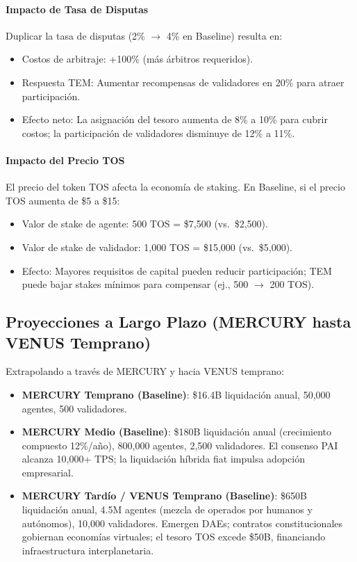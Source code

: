 \documentclass[11pt]{article}
\begin{document}
\paragraph{Impacto de Tasa de Disputas}
Duplicar la tasa de disputas (2\% $\to$ 4\% en Baseline) resulta en:
\begin{itemize}[noitemsep]
  \item Costos de arbitraje: +100\% (más árbitros requeridos).
  \item Respuesta TEM: Aumentar recompensas de validadores en 20\% para atraer participación.
  \item Efecto neto: La asignación del tesoro aumenta de 8\% a 10\% para cubrir costos; la participación de validadores disminuye de 12\% a 11\%.
\end{itemize}

\paragraph{Impacto del Precio TOS}
El precio del token TOS afecta la economía de staking. En Baseline, si el precio TOS aumenta de \$5 a \$15:
\begin{itemize}[noitemsep]
  \item Valor de stake de agente: 500 TOS = \$7{,}500 (vs.\ \$2{,}500).
  \item Valor de stake de validador: 1,000 TOS = \$15{,}000 (vs.\ \$5{,}000).
  \item Efecto: Mayores requisitos de capital pueden reducir participación; TEM puede bajar stakes mínimos para compensar (ej., 500 $\to$ 200 TOS).
\end{itemize}

\subsection{Proyecciones a Largo Plazo (MERCURY hasta VENUS Temprano)}
Extrapolando a través de MERCURY y hacia VENUS temprano:
\begin{itemize}[noitemsep]
  \item \textbf{MERCURY Temprano (Baseline)}: \$16.4B liquidación anual, 50,000 agentes, 500 validadores.
  \item \textbf{MERCURY Medio (Baseline)}: \$180B liquidación anual (crecimiento compuesto 12\%/año), 800,000 agentes, 2,500 validadores. El consenso PAI alcanza 10,000+ TPS; la liquidación híbrida fiat impulsa adopción empresarial.
  \item \textbf{MERCURY Tardío / VENUS Temprano (Baseline)}: \$650B liquidación anual, 4.5M agentes (mezcla de operados por humanos y autónomos), 10,000 validadores. Emergen DAEs; contratos constitucionales gobiernan economías virtuales; el tesoro TOS excede \$50B, financiando infraestructura interplanetaria.
\end{itemize}
\end{document}
